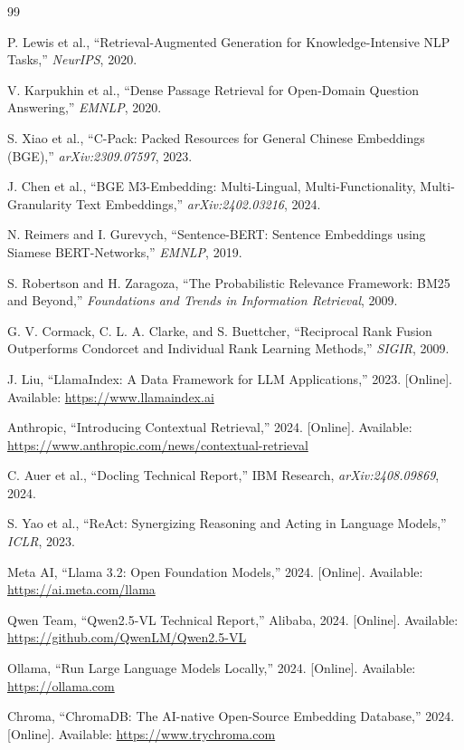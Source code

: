 \documentclass[12pt,a4paper]{report}
\begin{document}
\begin{thebibliography}{99}

 P. Lewis et al., ``Retrieval-Augmented Generation for
Knowledge-Intensive NLP Tasks,'' \emph{NeurIPS}, 2020.

 V. Karpukhin et al., ``Dense Passage Retrieval for Open-Domain
Question Answering,'' \emph{EMNLP}, 2020.

 S. Xiao et al., ``C-Pack: Packed Resources for General Chinese
Embeddings (BGE),'' \emph{arXiv:2309.07597}, 2023.

 J. Chen et al., ``BGE M3-Embedding: Multi-Lingual,
Multi-Functionality, Multi-Granularity Text Embeddings,'' \emph{arXiv:2402.03216},
2024.

 N. Reimers and I. Gurevych, ``Sentence-BERT: Sentence
Embeddings using Siamese BERT-Networks,'' \emph{EMNLP}, 2019.

 S. Robertson and H. Zaragoza, ``The Probabilistic Relevance
Framework: BM25 and Beyond,'' \emph{Foundations and Trends in Information
Retrieval}, 2009.

 G. V. Cormack, C. L. A. Clarke, and S. Buettcher, ``Reciprocal
Rank Fusion Outperforms Condorcet and Individual Rank Learning Methods,''
\emph{SIGIR}, 2009.

 J. Liu, ``LlamaIndex: A Data Framework for LLM
Applications,'' 2023. [Online]. Available: \url{https://www.llamaindex.ai}

 Anthropic, ``Introducing Contextual Retrieval,'' 2024.
[Online]. Available: \url{https://www.anthropic.com/news/contextual-retrieval}

 C. Auer et al., ``Docling Technical Report,'' IBM Research,
\emph{arXiv:2408.09869}, 2024.

 S. Yao et al., ``ReAct: Synergizing Reasoning and Acting in
Language Models,'' \emph{ICLR}, 2023.

 Meta AI, ``Llama 3.2: Open Foundation Models,'' 2024.
[Online]. Available: \url{https://ai.meta.com/llama}

 Qwen Team, ``Qwen2.5-VL Technical Report,'' Alibaba, 2024.
[Online]. Available: \url{https://github.com/QwenLM/Qwen2.5-VL}

 Ollama, ``Run Large Language Models Locally,'' 2024.
[Online]. Available: \url{https://ollama.com}

 Chroma, ``ChromaDB: The AI-native Open-Source Embedding
Database,'' 2024. [Online]. Available: \url{https://www.trychroma.com}

\end{thebibliography}
\end{document}
